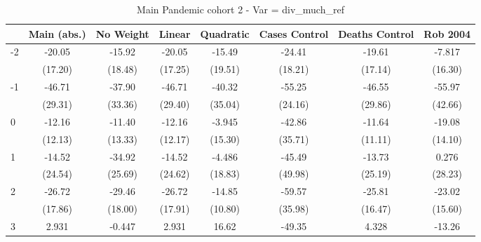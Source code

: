 \documentclass{article}
\begin{document}
{
\def\sym#1{\ifmmode^{#1}\else\(^{#1}\)\fi}
\begin{longtable}{l*{7}{c}}
\caption{Main Pandemic cohort 2 - Var = div\_much\_ref}\\
\hline\hline\endfirsthead\hline\endhead\hline\endfoot\endlastfoot
                &\multicolumn{1}{c}{Main (abs.)}&\multicolumn{1}{c}{No Weight}&\multicolumn{1}{c}{Linear}&\multicolumn{1}{c}{Quadratic}&\multicolumn{1}{c}{Cases Control}&\multicolumn{1}{c}{Deaths Control}&\multicolumn{1}{c}{Rob 2004}\\
\hline
-2              &   -20.05         &   -15.92         &   -20.05         &   -15.49         &   -24.41         &   -19.61         &   -7.817         \\
                &  (17.20)         &  (18.48)         &  (17.25)         &  (19.51)         &  (18.21)         &  (17.14)         &  (16.30)         \\
-1              &   -46.71         &   -37.90         &   -46.71         &   -40.32         &   -55.25         &   -46.55         &   -55.97         \\
                &  (29.31)         &  (33.36)         &  (29.40)         &  (35.04)         &  (24.16)         &  (29.86)         &  (42.66)         \\
0               &   -12.16         &   -11.40         &   -12.16         &   -3.945         &   -42.86         &   -11.64         &   -19.08         \\
                &  (12.13)         &  (13.33)         &  (12.17)         &  (15.30)         &  (35.71)         &  (11.11)         &  (14.10)         \\
1               &   -14.52         &   -34.92         &   -14.52         &   -4.486         &   -45.49         &   -13.73         &    0.276         \\
                &  (24.54)         &  (25.69)         &  (24.62)         &  (18.83)         &  (49.98)         &  (25.19)         &  (28.23)         \\
2               &   -26.72         &   -29.46         &   -26.72         &   -14.85         &   -59.57         &   -25.81         &   -23.02         \\
                &  (17.86)         &  (18.00)         &  (17.91)         &  (10.80)         &  (35.98)         &  (16.47)         &  (15.60)         \\
3               &    2.931         &   -0.447         &    2.931         &    16.62         &   -49.35         &    4.328         &   -13.26         \\

\end{longtable}}
\end{document}
